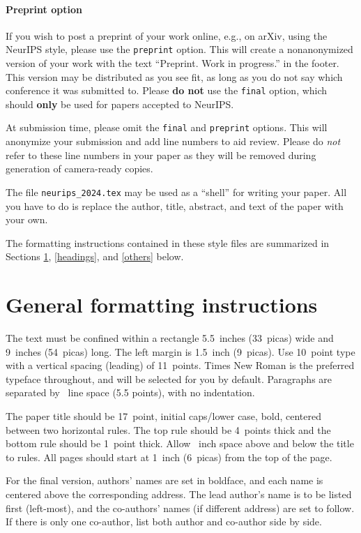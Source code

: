 \documentclass{article}
\begin{document}
	
	\paragraph{Preprint option}
	If you wish to post a preprint of your work online, e.g., on arXiv, using the
	NeurIPS style, please use the \verb+preprint+ option. This will create a
	nonanonymized version of your work with the text ``Preprint. Work in progress.''
	in the footer. This version may be distributed as you see fit, as long as you do not say which conference it was submitted to. Please \textbf{do
		not} use the \verb+final+ option, which should \textbf{only} be used for
	papers accepted to NeurIPS.
	
	
	At submission time, please omit the \verb+final+ and \verb+preprint+
	options. This will anonymize your submission and add line numbers to aid
	review. Please do \emph{not} refer to these line numbers in your paper as they
	will be removed during generation of camera-ready copies.
	
	
	The file \verb+neurips_2024.tex+ may be used as a ``shell'' for writing your
	paper. All you have to do is replace the author, title, abstract, and text of
	the paper with your own.
	
	
	The formatting instructions contained in these style files are summarized in
	Sections \ref{gen_inst}, \ref{headings}, and \ref{others} below.
	
	
	\section{General formatting instructions}
	\label{gen_inst}
	
	
	
	The text must be confined within a rectangle 5.5~inches (33~picas) wide and
	9~inches (54~picas) long. The left margin is 1.5~inch (9~picas).  Use 10~point
	type with a vertical spacing (leading) of 11~points.  Times New Roman is the
	preferred typeface throughout, and will be selected for you by default.
	Paragraphs are separated by ~line space (5.5 points), with no
	indentation.
	
	
	The paper title should be 17~point, initial caps/lower case, bold, centered
	between two horizontal rules. The top rule should be 4~points thick and the
	bottom rule should be 1~point thick. Allow ~inch space above and
	below the title to rules. All pages should start at 1~inch (6~picas) from the
	top of the page.
	
	
	For the final version, authors' names are set in boldface, and each name is
	centered above the corresponding address. The lead author's name is to be listed
	first (left-most), and the co-authors' names (if different address) are set to
	follow. If there is only one co-author, list both author and co-author side by
	side.
	
\end{document}

